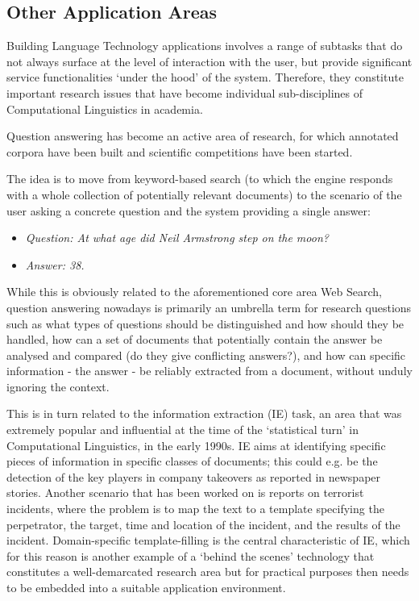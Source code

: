 \begin{multicols}{2}

\subsection{Other Application Areas}

Building Language Technology applications involves a range of subtasks that do not always surface at the level of interaction with the user, but provide significant service functionalities ‘under the hood’ of the system. Therefore, they constitute important research issues that have become individual sub-disciplines of Computational Linguistics in academia. 

Question answering has become an active area of research, for which annotated corpora have been built and scientific competitions have been started.

The idea is to move from keyword-based search (to which the engine responds with a whole collection of potentially relevant documents) to the scenario of the user asking a concrete question and the system providing a single answer: \\
\begin{itemize}
\item[] \textit{Question: At what age did Neil Armstrong step on the moon?}
\item[] \textit{Answer: 38.}
\end{itemize}

While this is obviously related to the aforementioned core area Web Search, question answering nowadays is primarily an umbrella term for research questions such as what types of questions should be distinguished and how should they be handled, how can a set of documents that potentially contain the answer be analysed and compared (do they give conflicting answers?), and how can specific information - the answer - be reliably extracted from a document, without unduly ignoring the context. 

This is in turn related to the information extraction (IE) task, an area that was extremely popular and influential at the time of the ‘statistical turn’ in Computational Linguistics, in the early 1990s. IE aims at identifying specific pieces of information in specific classes of documents; this could e.g. be the detection of the key players in company takeovers as reported in newspaper stories. Another scenario that has been worked on is reports on terrorist incidents, where the problem is to map the text to a template specifying the perpetrator, the target, time and location of the incident, and the results of the incident. Domain-specific template-filling is the central characteristic of IE, which for this reason is another example of a ‘behind the scenes’ technology that constitutes a well-demarcated research area but for practical purposes then needs to be embedded into a suitable application environment. 


\end{multicols}
